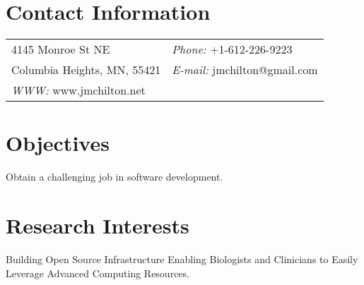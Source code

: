 \documentclass[margin,line]{res}
\begin{document}


\begin{resume}
\section{\sc Contact Information}
\vspace{.05in}
\begin{tabular}{@{}p{3in}p{4in}}
4145 Monroe St NE             & {\it Phone:}  +1-612-226-9223\\            
Columbia Heights, MN, 55421   & {\it E-mail:}  jmchilton@gmail.com \\
{\it WWW:} www.jmchilton.net  & \\     
\end{tabular}

{
\section{\sc Objectives}
Obtain a challenging job in software development.
}
{
\section{\sc Research Interests}
Building Open Source Infrastructure Enabling Biologists and Clinicians to Easily Leverage Advanced Computing Resources.
}


\end{resume}
\end{document}
